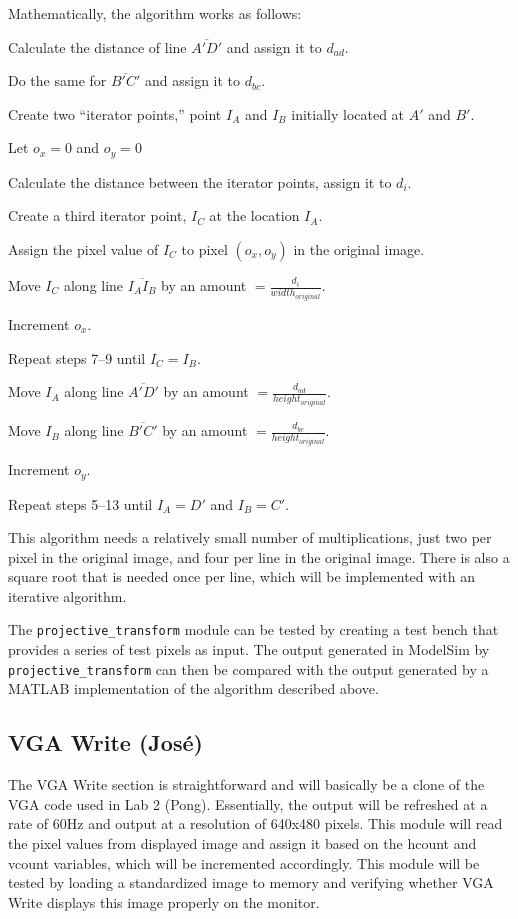 \documentclass[10pt]{article}
\begin{document}
Mathematically, the algorithm works as follows:
\begin{enumerate*}
\item Calculate the distance of line $\overline{A\prime D\prime}$ and assign it to $d_{ad}$.
\item Do the same for $\overline{B\prime C\prime}$ and assign it to $d_{bc}$.
\item Create two ``iterator points,'' point $I_A$ and $I_B$ initially located at $A\prime$ and $B\prime$.
\item Let $o_x = 0$ and $o_y = 0$
\item Calculate the distance between the iterator points, assign it to $d_i$.
\item Create a third iterator point, $I_C$ at the location $I_A$.
\item Assign the pixel value of $I_C$ to pixel $(o_x, o_y)$ in the original image.
\item Move $I_C$ along line $\overline{I_A I_B}$ by an amount $= \frac{d_i}{width_{original}}$.
\item Increment $o_x$.
\item Repeat steps 7--9 until $I_C = I_B$.
\item Move $I_A$ along line $\overline{A\prime D\prime}$ by an amount $= \frac{d_{ad}}{height_{original}}$.
\item Move $I_B$ along line $\overline{B\prime C\prime}$ by an amount $= \frac{d_{bc}}{height_{original}}$.
\item Increment $o_y$.
\item Repeat steps 5--13 until $I_A = D\prime$ and $I_B = C\prime$.
\end{enumerate*}

This algorithm needs a relatively small number of multiplications, just two per pixel in the original image, and four per line in the original image. There is also a square root that is needed once per line, which will be implemented with an iterative algorithm.

The {\tt projective\_transform} module can be tested by creating a test bench that provides a series of test pixels as input. The output generated in ModelSim by {\tt projective\_transform} can then be compared with the output generated by a MATLAB implementation of the algorithm described above.

\subsection{VGA Write (Jos\'{e})}
The VGA Write section is straightforward and will basically be a clone of the VGA code used in Lab 2 (Pong). Essentially, the output will be refreshed at a rate of 60Hz and output at a resolution of 640x480 pixels. This module will read the pixel values from displayed image and assign it based on the hcount and vcount variables, which will be incremented accordingly. This module will be tested by loading a standardized image to memory and verifying whether VGA Write displays this image properly on the monitor.
\end{document}
